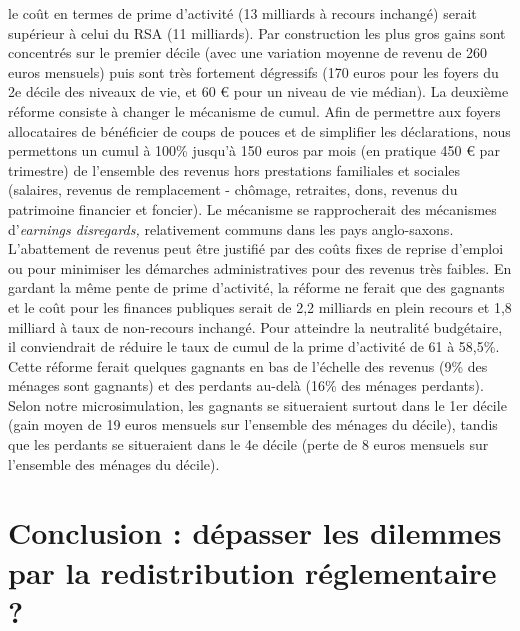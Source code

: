 \documentclass[
  french,
]{article}
\begin{document}
\begin{tcolorbox}
le coût en termes de prime d'activité (13 milliards à recours inchangé)
serait supérieur à celui du RSA (11 milliards). Par construction les
plus gros gains sont concentrés sur le premier décile (avec une
variation moyenne de revenu de 260 euros mensuels) puis sont très
fortement dégressifs (170 euros pour les foyers du 2e décile des niveaux
de vie, et 60 € pour un niveau de vie médian). La deuxième réforme
consiste à changer le mécanisme de cumul. Afin de permettre aux foyers
allocataires de bénéficier de coups de pouces et de simplifier les
déclarations, nous permettons un cumul à 100\% jusqu'à 150 euros par
mois (en pratique 450 € par trimestre) de l'ensemble des revenus hors
prestations familiales et sociales (salaires, revenus de remplacement -
chômage, retraites, dons, revenus du patrimoine financier et foncier).
Le mécanisme se rapprocherait des mécanismes d'\emph{earnings
disregards,} relativement communs dans les pays anglo-saxons.
L'abattement de revenus peut être justifié par des coûts fixes de
reprise d'emploi ou pour minimiser les démarches administratives pour
des revenus très faibles. En gardant la même pente de prime d'activité,
la réforme ne ferait que des gagnants et le coût pour les finances
publiques serait de 2,2 milliards en plein recours et 1,8 milliard à
taux de non-recours inchangé. Pour atteindre la neutralité budgétaire,
il conviendrait de réduire le taux de cumul de la prime d'activité de 61
à 58,5\%. Cette réforme ferait quelques gagnants en bas de l'échelle des
revenus (9\% des ménages sont gagnants) et des perdants au-delà (16\%
des ménages perdants). Selon notre microsimulation, les gagnants se
situeraient surtout dans le 1er décile (gain moyen de 19 euros mensuels
sur l'ensemble des ménages du décile), tandis que les perdants se
situeraient dans le 4e décile (perte de 8 euros mensuels sur l'ensemble
des ménages du décile).

\end{tcolorbox}

\section{Conclusion : dépasser les dilemmes par la redistribution
réglementaire
?}\label{conclusion-duxe9passer-les-dilemmes-par-la-redistribution-ruxe9glementaire}
\end{document}
